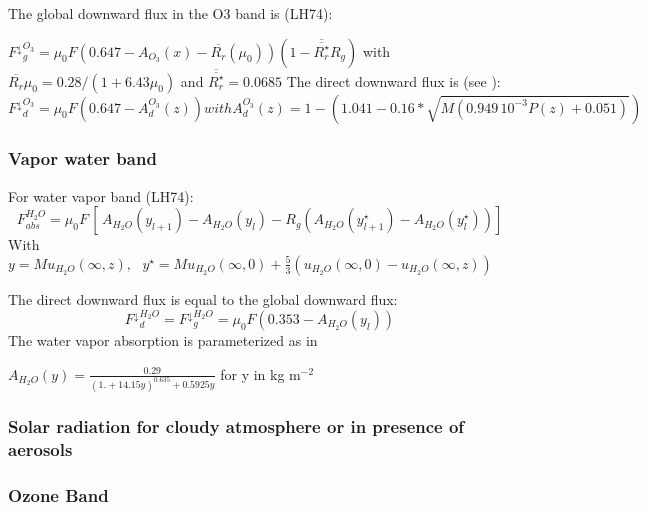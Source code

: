 The global downward flux in the O3 band is (LH74):

${F^\downarrow}_{g}^{O_{3}}=\mu_{0}F(0.647-A_{O_{3}}\left( x
\right)-\overline{R_{r}}\left( \mu_{0} \right))(1-
\overline{\overline{R_{r}^{\star }}}
R_{g})$
\newline
with $\overline{R_{r}} \mu_{0}=0.28/(1+6.43\mu_{0})$
\newline
and $\overline{\overline{R_{r}^{\star }}}=0.0685$
\newline
\newline
The direct downward flux is (see \cite{Atwater:1978}):
\begin{equation}
{F^\downarrow }_{d}^{O_{3}}=\mu_{0}F\left( 0.647-A_{d}^{O_{3}}\left( z \right)
\right)with
A_{d}^{O_{3}}\left( z \right)=1-(1.041-0.16\ast \sqrt {M\left( 0.949\,
{10}^{-3}P\left( z \right)+0.051 \right)} )
\end{equation}
\subsubsection{Vapor water band}

For water vapor band (LH74):
\begin{equation}
F_{abs}^{H_{2}O}=\mu_{0}F\, [\, A_{H_{2}O}\left( y_{l+1} \right)-A_{H_{2}O}\left(
y_{l} \right)-R_{g}\left( A_{H_{2}O}\left( y_{l+1}^{\star }
\right)-A_{H_{2}O}\left( y_{l}^{\star } \right) \right)]
\end{equation}
\newline
With $y=Mu_{H_{2}O}\left( \infty ,z \right),\, \, \, \, y^{\star
}=Mu_{H_{2}O}\left( \infty ,0 \right)+\frac{5}{3}(u_{H_{2}O}\left( \infty ,0
\right)-u_{H_{2}O}\left( \infty ,z \right))$

The direct downward flux is equal to the global downward flux:
\begin{equation}
{F^\downarrow }_{d}^{H_{2}O}={F^\downarrow }_{g}^{H_{2}O}=\mu_{0}F\left(
0.353-A_{H_{2}O}\left( y_{l} \right) \right)
\end{equation}
The water vapor absorption is parameterized as in \cite{Yamamoto:1962}

$A_{H_{2}O}\left( y \right)=\frac{0.29}{{(1.+14.15y)}^{0.635}+0.5925y}$ for y in
kg m$^{-2}$

\subsubsection{Solar radiation for cloudy atmosphere or in presence of aerosols}
\subsubsection{Ozone Band}

